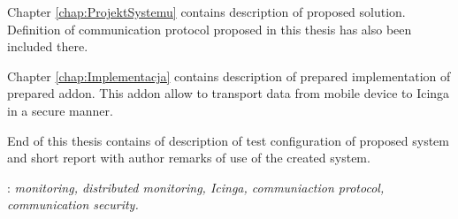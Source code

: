 \begin{titlepage}
{      \indent Chapter \ref{chap:ProjektSystemu} contains description
      of proposed solution. Definition of communication protocol
      proposed in this thesis has also been included there.

      \indent Chapter \ref{chap:Implementacja} contains description of
      prepared implementation of prepared addon. This addon allow to
      transport data from mobile device to Icinga in a secure manner.

      \indent End of this thesis contains of description of test
      configuration of proposed system and short report with author remarks
      of use of the created system. } \vspace*{1\baselineskip}

    : {\itshape monitoring, distributed
      monitoring, Icinga, communiaction protocol, communication security.}

\end{titlepage}


